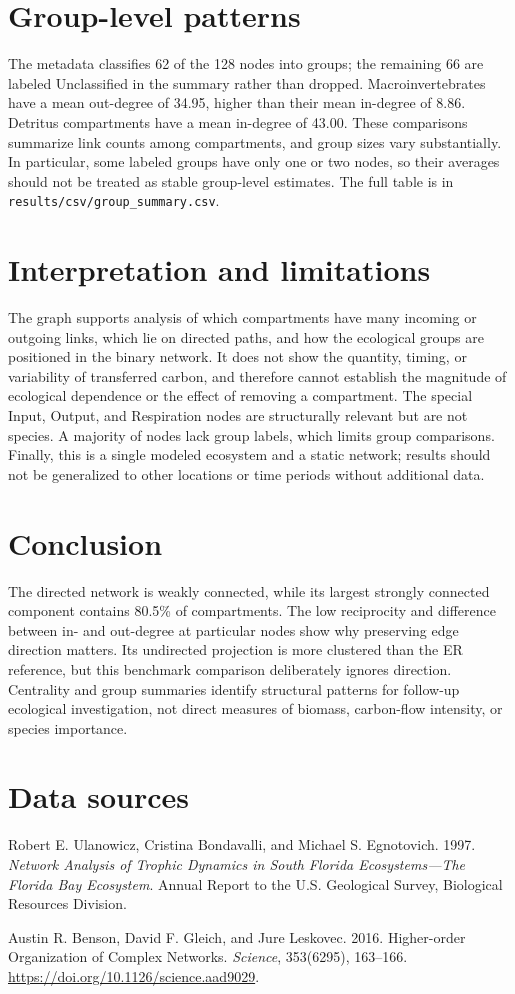 \documentclass[11pt]{article}
\begin{document}
\section{Group-level patterns}

The metadata classifies 62 of the 128 nodes into groups; the remaining 66 are labeled Unclassified in the summary rather than dropped. Macroinvertebrates have a mean out-degree of 34.95, higher than their mean in-degree of 8.86. Detritus compartments have a mean in-degree of 43.00. These comparisons summarize link counts among compartments, and group sizes vary substantially. In particular, some labeled groups have only one or two nodes, so their averages should not be treated as stable group-level estimates. The full table is in \texttt{results/csv/group\_summary.csv}.

\section{Interpretation and limitations}

The graph supports analysis of which compartments have many incoming or outgoing links, which lie on directed paths, and how the ecological groups are positioned in the binary network. It does not show the quantity, timing, or variability of transferred carbon, and therefore cannot establish the magnitude of ecological dependence or the effect of removing a compartment. The special Input, Output, and Respiration nodes are structurally relevant but are not species. A majority of nodes lack group labels, which limits group comparisons. Finally, this is a single modeled ecosystem and a static network; results should not be generalized to other locations or time periods without additional data.

\section{Conclusion}

The directed network is weakly connected, while its largest strongly connected component contains 80.5\% of compartments. The low reciprocity and difference between in- and out-degree at particular nodes show why preserving edge direction matters. Its undirected projection is more clustered than the ER reference, but this benchmark comparison deliberately ignores direction. Centrality and group summaries identify structural patterns for follow-up ecological investigation, not direct measures of biomass, carbon-flow intensity, or species importance.

\section*{Data sources}
Robert E. Ulanowicz, Cristina Bondavalli, and Michael S. Egnotovich. 1997. \textit{Network Analysis of Trophic Dynamics in South Florida Ecosystems---The Florida Bay Ecosystem}. Annual Report to the U.S. Geological Survey, Biological Resources Division.

Austin R. Benson, David F. Gleich, and Jure Leskovec. 2016. Higher-order Organization of Complex Networks. \textit{Science}, 353(6295), 163--166. \url{https://doi.org/10.1126/science.aad9029}.
\end{document}
